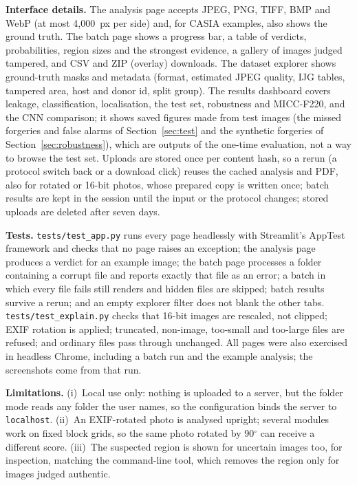 \textbf{Interface details.} The analysis page accepts JPEG, PNG, TIFF, BMP and WebP (at most 4,000~px per side) and, for
CASIA examples, also shows the ground truth. The batch page shows a progress bar, a table of verdicts, probabilities,
region sizes and the strongest evidence, a gallery of images judged tampered, and CSV and ZIP (overlay) downloads. The
dataset explorer shows ground-truth masks and metadata (format, estimated JPEG quality, IJG tables, tampered area,
host and donor id, split group). The results dashboard covers leakage, classification, localisation, the test set,
robustness and MICC-F220, and the CNN comparison; it shows saved figures made from test images (the missed forgeries
and false alarms of Section~\ref{sec:test} and the synthetic forgeries of Section~\ref{sec:robustness}), which are
outputs of the one-time evaluation, not a way to browse the test set. Uploads are stored once per content hash, so a
rerun (a protocol switch back or a download click) reuses the cached analysis and PDF, also for rotated or 16-bit
photos, whose prepared copy is written once; batch results are kept in the session until the input or the protocol
changes; stored uploads are deleted after seven days.

\textbf{Tests.} \texttt{tests/test\_app.py} runs every page headlessly with Streamlit's AppTest framework and checks
that no page raises an exception; the analysis page produces a verdict for an example image; the batch page processes
a folder containing a corrupt file and reports exactly that file as an error; a batch in which every file fails still
renders and hidden files are skipped; batch results survive a rerun; and an empty explorer filter does not blank the
other tabs. \texttt{tests/test\_explain.py} checks that 16-bit images are rescaled, not clipped; EXIF rotation is
applied; truncated, non-image, too-small and too-large files are refused; and ordinary files pass through unchanged.
All pages were also exercised in headless Chrome, including a batch run and the example analysis; the screenshots come
from that run.

\textbf{Limitations.} (i)~Local use only: nothing is uploaded to a server, but the folder mode reads any folder the user
names, so the configuration binds the server to \texttt{localhost}. (ii)~An EXIF-rotated photo is analysed upright;
several modules work on fixed block grids, so the same photo rotated by 90$^\circ$ can receive a different score.
(iii)~The suspected region is shown for uncertain images too, for inspection, matching the command-line tool, which
removes the region only for images judged authentic.
